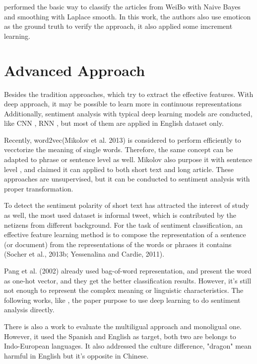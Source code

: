 \cite{zhao2012moodlens} performed the basic way to classify the articles from WeiBo with Naive Bayes and smoothing with Laplace smooth.  
In this work, the authors also use emoticon as the ground truth to verify the approach, it also applied some imcrement learning. \\


\section{Advanced Approach}

Besides the tradition approaches, which try to extract the effective features. With deep approach, it may be possible to learn more in  continuous representations
Additionally, sentiment analysis with typical deep learning models are conducted, like CNN 
\cite{kim2014convolutional}, RNN \cite{arevian2007recurrent}, but most of them are applied in English dataset only. 

Recently, word2vec(Mikolov et al. 2013)\cite{word2vec} is considered to perform efficiently to vecctorize the meaning of single words. Therefore, the same concept can be adapted to phrase or sentence level as well.
Mikolov also purpose it with sentence level \cite{PVDB}, and claimed it can applied to both short text and long article. These approaches are unsupervised, but it can be conducted to sentiment analysis with proper transformation. 

To detect the sentiment polarity of short text has attracted the interest of study as well, the most used dataset is informal tweet, which is contributed by the netizens from different background. 
For the task of sentiment classification, an effective feature learning method is to compose the representation of a
sentence (or document) from the representations of the words or phrases it contains (Socher et al., 2013b; Yessenalina and Cardie, 2011).

Pang et al. (2002)\cite{pang2002thumbs} already used bag-of-word representation, and present the word as one-hot vector, and they get the better classification results. However, it's still not enough to represent the complex meaning or linguistic characteristics.
The following works, like \cite{tang2014learning}, the paper purpose to use deep learning to do sentiment analysis directly.

There is also a work\cite{multilingual} to evaluate the multiligual approach and monoligual one. However, it used the Spanish and English as target, both two are belongs 
to Indo-European languages. It also addressed the culture difference, "dragon" mean harmful in English but it's opposite in Chinese. 
